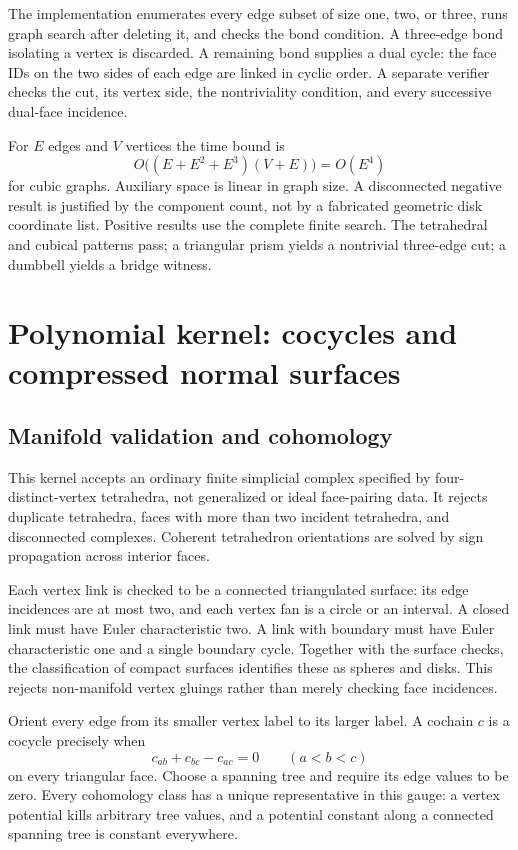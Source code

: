 \documentclass[11pt]{article}
\theoremstyle{definition}
\begin{document}
The implementation enumerates every edge subset of size one, two, or three,
runs graph search after deleting it, and checks the bond condition. A
three-edge bond isolating a vertex is discarded. A remaining bond supplies a
dual cycle: the face IDs on the two sides of each edge are linked in cyclic
order. A separate verifier checks the cut, its vertex side, the nontriviality
condition, and every successive dual-face incidence.

For $E$ edges and $V$ vertices the time bound is
\[
 O\bigl((E+E^2+E^3)(V+E)\bigr)=O(E^4)
\]
for cubic graphs. Auxiliary space is linear in graph size. A disconnected
negative result is justified by the component count, not by a fabricated
geometric disk coordinate list. Positive results use the complete finite search.
The tetrahedral and cubical patterns pass; a triangular prism yields a
nontrivial three-edge cut; a dumbbell yields a bridge witness.

\section{Polynomial kernel: cocycles and compressed normal surfaces}

\subsection{Manifold validation and cohomology}

This kernel accepts an ordinary finite simplicial complex specified by
four-distinct-vertex tetrahedra, not generalized or ideal face-pairing data.
It rejects duplicate tetrahedra, faces with more than two incident tetrahedra,
and disconnected complexes. Coherent tetrahedron orientations are solved by
sign propagation across interior faces.

Each vertex link is checked to be a connected triangulated surface: its edge
incidences are at most two, and each vertex fan is a circle or an interval.
A closed link must have Euler characteristic two. A link with boundary must
have Euler characteristic one and a single boundary cycle. Together with the
surface checks, the classification of compact surfaces identifies these as
spheres and disks. This rejects non-manifold vertex gluings rather than merely
checking face incidences.

Orient every edge from its smaller vertex label to its larger label. A
cochain $c$ is a cocycle precisely when
\[
 c_{ab}+c_{bc}-c_{ac}=0\qquad(a<b<c)
\]
on every triangular face. Choose a spanning tree and require its edge values
to be zero. Every cohomology class has a unique representative in this gauge:
a vertex potential kills arbitrary tree values, and a potential constant along
a connected spanning tree is constant everywhere.
\end{document}
